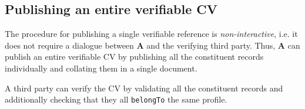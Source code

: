\documentclass[a4paper, bibliography=totoc, titlepage=false]{scrartcl}
\begin{document}
\subsection{Publishing an entire verifiable CV}

The procedure for publishing a single verifiable reference is \emph{non-interactive}, i.e. it does not require a dialogue between \textbf{A} and the verifying third party. Thus, \textbf{A} can publish an entire verifiable CV by publishing all the constituent records individually and collating them in a single document.

A third party can verify the CV by validating all the constituent records and additionally checking that they all \texttt{belongTo} the same profile.


\printbibliography
\end{document}
